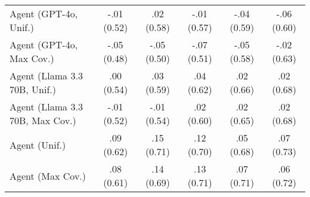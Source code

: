 \begin{table}[h!]
\begin{tabular}{lccccc}
    Agent (GPT-4o, Unif.) & -.01 {\small (0.52)} & .02 {\small (0.58)} & -.01 {\small (0.57)} & -.04 {\small (0.59)} & -.06 {\small (0.60)} \\
    Agent (GPT-4o, Max Cov.) & -.05 {\small (0.48)} & -.05 {\small (0.50)} & -.07 {\small (0.51)} & -.05 {\small (0.58)} & -.02 {\small (0.63)} \\
    Agent (Llama 3.3 70B, Unif.) & .00 {\small (0.54)} & .03 {\small (0.59)} & .04 {\small (0.62)} & .02 {\small (0.66)} & .02 {\small (0.68)} \\
    Agent (Llama 3.3 70B, Max Cov.) & -.01 {\small (0.52)} & -.01 {\small (0.54)} & .02 {\small (0.60)} & .02 {\small (0.65)} & .02 {\small (0.68)} \\
    Agent (Unif.) & .09 {\small (0.62)} & \cellcolor{bronze!30}.15 {\small (0.71)} & .12 {\small (0.70)} & .05 {\small (0.68)} & \cellcolor{silver!30}.07 {\small (0.73)} \\
    Agent (Max Cov.) & .08 {\small (0.61)} & .14 {\small (0.69)} & \cellcolor{bronze!30}.13 {\small (0.71)} & \cellcolor{gold!30}.07 {\small (0.71)} & .06 {\small (0.72)} \\
    \bottomrule
    \end{tabular}
\end{table}